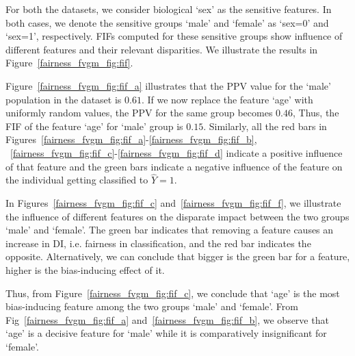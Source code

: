 For both the datasets, we consider biological `sex' as the sensitive features.
In both cases, we denote the sensitive groups `male' and `female' as `sex=0' and `sex=1', respectively. 
FIFs computed for these sensitive groups show influence of different features and their relevant disparities. We illustrate the results in Figure~\ref{fairness_fvgm_fig:fif}.

Figure~\ref{fairness_fvgm_fig:fif_a} illustrates that the PPV value for the `male' population in the dataset is $0.61$. If we now replace the feature `age' with uniformly random values, the PPV for the same group becomes $0.46$, Thus, the FIF of the feature `age' for `male' group is $0.15$.
Similarly, all the red bars in Figures~\ref{fairness_fvgm_fig:fif_a}-\ref{fairness_fvgm_fig:fif_b}, ~\ref{fairness_fvgm_fig:fif_c}-\ref{fairness_fvgm_fig:fif_d} indicate a positive influence of that feature and the green bars indicate a negative influence of the feature on the individual getting classified to $\hat{Y}=1$.

In Figures~\ref{fairness_fvgm_fig:fif_c} and~\ref{fairness_fvgm_fig:fif_f}, we illustrate the influence of different features on the disparate impact between the two groups `male' and `female'. 
The green bar indicates that removing a feature causes an increase in DI, i.e. fairness in classification, and the red bar indicates the opposite. Alternatively, we can conclude that bigger is the green bar for a feature, higher is the bias-inducing effect of it.

Thus, from Figure~\ref{fairness_fvgm_fig:fif_c}, we conclude that `age' is the most bias-inducing feature among the two groups `male' and `female'.
From Fig~\ref{fairness_fvgm_fig:fif_a} and~\ref{fairness_fvgm_fig:fif_b}, we observe that `age' is a decisive feature for `male' while it is comparatively insignificant for `female'.

